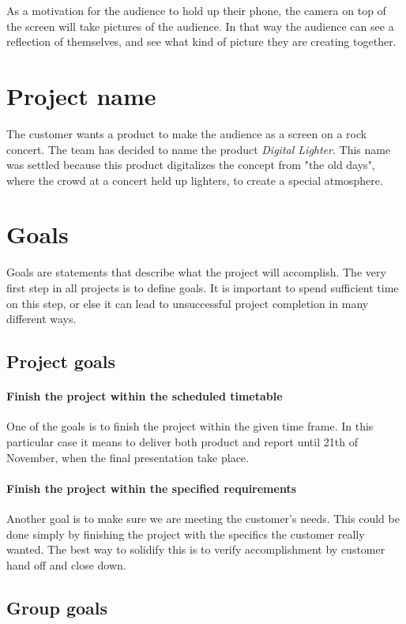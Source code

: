 As a motivation for the audience to hold up their phone, the camera on top of the screen will take pictures of the audience.
In that way the audience can see a reflection of themselves, and see what kind of picture they are creating together.

\section{Project name}
The customer wants a product to make the audience as a screen on a rock concert. 
The team has decided to name the product \emph{Digital Lighter}. 
This name was settled because this product digitalizes the concept from "the old days", where the crowd at a concert held up lighters, to create a special atmosphere. 

\section{Goals}
Goals are statements that describe what the project will accomplish. 
The very first step in all projects is to define goals. 
It is important to spend sufficient time on this step, or else it can lead to unsuccessful project completion in many different ways. 
   
\label{sec:project-goals}

\subsection{Project goals}

\paragraph{Finish the project within the scheduled timetable}
One of the goals is to finish the project within the given time frame. 
In this particular case it means to deliver both product and report until 21th of November, when the final presentation take place.

\paragraph{Finish the project within the specified requirements}
Another goal is to make sure we are meeting the customer's needs.
This could be done simply by finishing the project with the specifics the customer really wanted. 
The best way to solidify this is to verify accomplishment by customer hand off and close down.

\subsection{Group goals}
